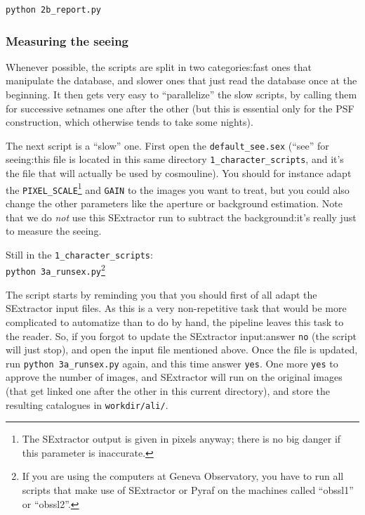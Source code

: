 \begin{Verbatim}
python 2b_report.py
\end{Verbatim}

\subsubsection{Measuring the seeing}

Whenever possible, the scripts are split in two categories:fast ones that manipulate the database, and slower ones that just read the database once at the beginning. It then gets very easy to ``parallelize'' the slow scripts, by calling them for successive setnames one after the other (but this is essential only for the PSF construction, which otherwise tends to take some nights).

The next script is a ``slow'' one.
First open the \verb+default_see.sex+ (``see'' for seeing:this file is located in this same directory \verb+1_character_scripts+, and it's the file that will actually be used by cosmouline). You should for instance adapt the \verb+PIXEL_SCALE+\footnote{The SExtractor output is given in pixels anyway; there is no big danger if this parameter is inaccurate.} and \verb+GAIN+ to the images you want to treat, but you could also change the other parameters like the aperture or background estimation. Note that we do \emph{not} use this SExtractor run to subtract the background:it's really just to measure the seeing.

Still in the \verb+1_character_scripts+:\\
\verb+python 3a_runsex.py+\footnote{If you are using the computers at Geneva Observatory, you have to run all scripts that make use of SExtractor or Pyraf on the machines called ``obssl1'' or ``obssl2''. }


The script starts by reminding you that you should first of all adapt the SExtractor input files. As this is a very non-repetitive task that would be more complicated to automatize than to do by hand, the pipeline leaves this task to the reader. So, if you forgot to update the SExtractor input:answer \verb+no+ (the script will just stop), and open the input file mentioned above. 
Once the file is updated, run \verb+python 3a_runsex.py+ again, and this time answer \verb+yes+. One more \verb+yes+ to approve the number of images, and SExtractor will run on the original images (that get linked one after the other in this current directory), and store the resulting catalogues in \verb+workdir/ali/+.

